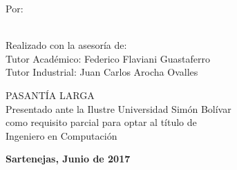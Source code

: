
\begin{titlepage}
\begin{center}

\usbheader

\bigskip
\bigskip
\bigskip
\bigskip
\bigskip
\bigskip
\bigskip
\bigskip
\bigskip
\bigskip
\bigskip
\bigskip

\begin{minipage}{12cm}
\begin{center}
\textsc{\bfseries\uppercase{\projecttitle}}
\end{center}
\end{minipage}

\bigskip
\bigskip
\bigskip
\bigskip

\begin{minipage}{\textwidth}
\centering
Por: \\
\projectauthor \\
\end{minipage}

\bigskip
\bigskip

\begin{minipage}{\textwidth}
\centering
Realizado con la asesoría de: \\
Tutor Académico: Federico Flaviani Guastaferro \\
Tutor Industrial: Juan Carlos Arocha Ovalles
\end{minipage}

\bigskip
\bigskip
\bigskip
\bigskip
\bigskip

{PASANTÍA LARGA \\ Presentado ante la Ilustre Universidad Simón Bolívar \\
como requisito parcial para optar al título de \\ Ingeniero en Computación} \\

\bigskip
\bigskip
\vfill

{\large \bfseries Sartenejas, Junio de 2017}

\end{center}
\end{titlepage}
